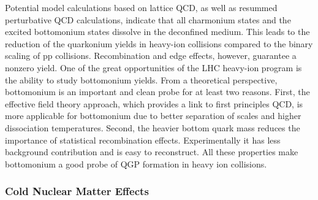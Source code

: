 Potential model calculations based on lattice QCD, as well as resummed 
perturbative QCD calculations, indicate that all charmonium states and the
excited bottomonium states dissolve in the deconfined medium. This leads to 
the reduction of the quarkonium yields in heavy-ion collisions 
compared to the binary scaling of pp collisions. Recombination and edge
effects, however, guarantee a nonzero yield. One of the great opportunities of the 
LHC heavy-ion program is the ability to study bottomonium yields. 
From a theoretical perspective, bottomonium is an important and clean probe 
for at least two reasons. 
First, the effective field theory approach, which provides a link to first 
principles QCD, is more applicable for bottomonium due to better separation of 
scales and higher dissociation temperatures. Second, the heavier bottom quark 
mass reduces the importance of statistical recombination effects.
Experimentally it has less background contribution and is easy to reconstruct. 
All these properties make bottomonium a good probe of 
QGP formation in heavy ion collisions.



              
\subsubsection{Cold Nuclear Matter Effects}

